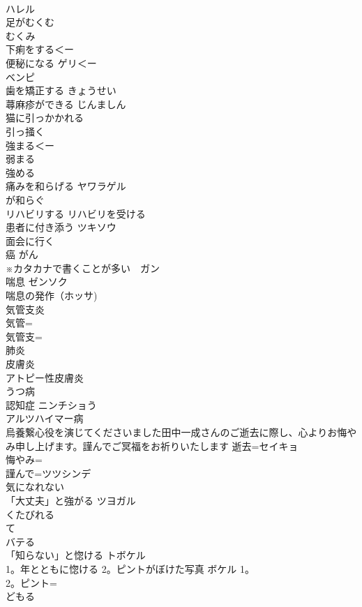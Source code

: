 \documentclass[8pt]{extreport}
\begin{document}
\begin{CJK}{UTF8}{min}
\\	ハレル
\\	足がむくむ	
\\	むくみ 
\\	下痢をする＜ー
\\	便秘になる	ゲリ＜ー
\\	ベンピ 
\\	歯を矯正する	きょうせい 
\\	蕁麻疹ができる	じんましん 
\\	猫に引っかかれる	
\\	引っ掻く 
\\	強まる＜ー
\\	弱まる	
\\	強める 
\\	痛みを和らげる	ヤワラゲル 
\\	が和らぐ
\\	リハビリする リハビリを受ける	
\\	患者に付き添う	ツキソウ 
\\	面会に行く	
\\	癌	がん 
\\	※カタカナで書くことが多い　ガン
\\	喘息	ゼンソク 
\\	喘息の発作（ホッサ) 
\\	気管支炎	
\\	気管=
\\	気管支=
\\	肺炎	
\\	皮膚炎	
\\	アトピー性皮膚炎 
\\	うつ病	
\\	認知症	ニンチショう 
\\	アルツハイマー病
\\	烏養繋心役を演じてくださいました田中一成さんのご逝去に際し、心よりお悔やみ申し上げます。謹んでご冥福をお祈りいたします	逝去=セイキョ 
\\	悔やみ=
\\	謹んで=ツツシンデ 
\\	気になれない	
\\	「大丈夫」と強がる	ツヨガル 
\\	くたびれる	
\\	て
\\	バテる	
\\	「知らない」と惚ける	トボケル 
\\	1。年とともに惚ける 2。ピントがぼけた写真	ボケル 1。
\\	2。ピント=
\\	どもる	

\end{CJK}
\end{document}
